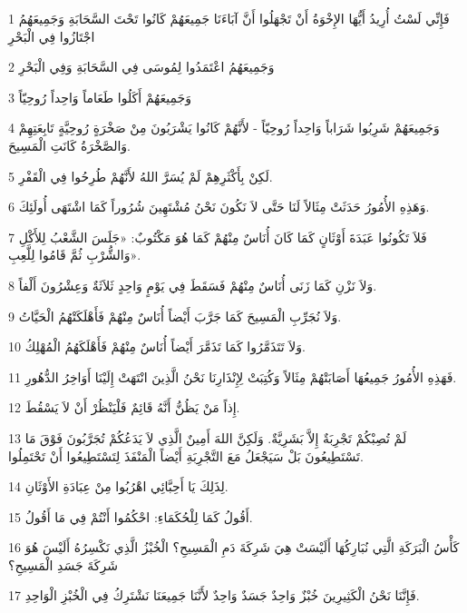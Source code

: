 \par 1 فَإِنِّي لَسْتُ أُرِيدُ أَيُّهَا الإِخْوَةُ أَنْ تَجْهَلُوا أَنَّ آبَاءَنَا جَمِيعَهُمْ كَانُوا تَحْتَ السَّحَابَةِ وَجَمِيعَهُمُ اجْتَازُوا فِي الْبَحْرِ
\par 2 وَجَمِيعَهُمُ اعْتَمَدُوا لِمُوسَى فِي السَّحَابَةِ وَفِي الْبَحْرِ
\par 3 وَجَمِيعَهُمْ أَكَلُوا طَعَاماً وَاحِداً رُوحِيّاً
\par 4 وَجَمِيعَهُمْ شَرِبُوا شَرَاباً وَاحِداً رُوحِيّاً - لأَنَّهُمْ كَانُوا يَشْرَبُونَ مِنْ صَخْرَةٍ رُوحِيَّةٍ تَابِعَتِهِمْ وَالصَّخْرَةُ كَانَتِ الْمَسِيحَ.
\par 5 لَكِنْ بِأَكْثَرِهِمْ لَمْ يُسَرَّ اللهُ لأَنَّهُمْ طُرِحُوا فِي الْقَفْرِ.
\par 6 وَهَذِهِ الأُمُورُ حَدَثَتْ مِثَالاً لَنَا حَتَّى لاَ نَكُونَ نَحْنُ مُشْتَهِينَ شُرُوراً كَمَا اشْتَهَى أُولَئِكَ.
\par 7 فَلاَ تَكُونُوا عَبَدَةَ أَوْثَانٍ كَمَا كَانَ أُنَاسٌ مِنْهُمْ كَمَا هُوَ مَكْتُوبٌ: «جَلَسَ الشَّعْبُ لِلأَكْلِ وَالشُّرْبِ ثُمَّ قَامُوا لِلَّعِبِ».
\par 8 وَلاَ نَزْنِ كَمَا زَنَى أُنَاسٌ مِنْهُمْ فَسَقَطَ فِي يَوْمٍ وَاحِدٍ ثَلاَثَةٌ وَعِشْرُونَ أَلْفاً.
\par 9 وَلاَ نُجَرِّبِ الْمَسِيحَ كَمَا جَرَّبَ أَيْضاً أُنَاسٌ مِنْهُمْ فَأَهْلَكَتْهُمُ الْحَيَّاتُ.
\par 10 وَلاَ تَتَذَمَّرُوا كَمَا تَذَمَّرَ أَيْضاً أُنَاسٌ مِنْهُمْ فَأَهْلَكَهُمُ الْمُهْلِكُ.
\par 11 فَهَذِهِ الأُمُورُ جَمِيعُهَا أَصَابَتْهُمْ مِثَالاً وَكُتِبَتْ لِإِنْذَارِنَا نَحْنُ الَّذِينَ انْتَهَتْ إِلَيْنَا أَوَاخِرُ الدُّهُورِ.
\par 12 إِذاً مَنْ يَظُنُّ أَنَّهُ قَائِمٌ فَلْيَنْظُرْ أَنْ لاَ يَسْقُطَ.
\par 13 لَمْ تُصِبْكُمْ تَجْرِبَةٌ إِلاَّ بَشَرِيَّةٌ. وَلَكِنَّ اللهَ أَمِينٌ الَّذِي لاَ يَدَعُكُمْ تُجَرَّبُونَ فَوْقَ مَا تَسْتَطِيعُونَ بَلْ سَيَجْعَلُ مَعَ التَّجْرِبَةِ أَيْضاً الْمَنْفَذَ لِتَسْتَطِيعُوا أَنْ تَحْتَمِلُوا.
\par 14 لِذَلِكَ يَا أَحِبَّائِي اهْرُبُوا مِنْ عِبَادَةِ الأَوْثَانِ.
\par 15 أَقُولُ كَمَا لِلْحُكَمَاءِ: احْكُمُوا أَنْتُمْ فِي مَا أَقُولُ.
\par 16 كَأْسُ الْبَرَكَةِ الَّتِي نُبَارِكُهَا أَلَيْسَتْ هِيَ شَرِكَةَ دَمِ الْمَسِيحِ؟ الْخُبْزُ الَّذِي نَكْسِرُهُ أَلَيْسَ هُوَ شَرِكَةَ جَسَدِ الْمَسِيحِ؟
\par 17 فَإِنَّنَا نَحْنُ الْكَثِيرِينَ خُبْزٌ وَاحِدٌ جَسَدٌ وَاحِدٌ لأَنَّنَا جَمِيعَنَا نَشْتَرِكُ فِي الْخُبْزِ الْوَاحِدِ.
